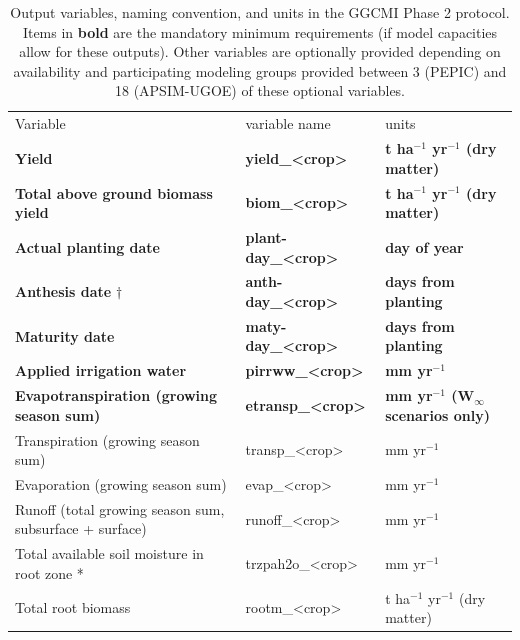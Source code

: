 \documentclass[gmd, manuscript]{copernicus} %
\begin{document}
\begin{table}[]
  \caption{Output variables, naming convention, and units in the GGCMI Phase 2 protocol. Items in \textbf{bold} are the mandatory minimum requirements (if model capacities allow for these outputs). Other variables are optionally provided depending on availability and participating modeling groups provided between 3 (PEPIC) and 18 (APSIM-UGOE) of these optional variables.}
  \label{table:outputs}
  \begin{tabular}{lll}
    \tophline \vspace{1mm}
    Variable                                & variable name             & units \\
    \middlehline \vspace{1mm}
    \textbf{Yield}                                   & \textbf{yield\_<crop>}     & \textbf{t ha$^{-1}$ yr$^{-1}$ (dry matter)}\\
    \textbf{Total above ground biomass yield}        & \textbf{biom\_<crop>}      & \textbf{t ha$^{-1}$ yr$^{-1}$ (dry matter)}\\
    \textbf{Actual planting date}                    & \textbf{plant-day\_<crop>} & \textbf{day of year}\\
    \textbf{Anthesis date} $\dagger$                 & \textbf{anth-day\_<crop>}  & \textbf{days from planting} \\
    \textbf{Maturity date}                           & \textbf{maty-day\_<crop>}  & \textbf{days from planting}\\
    \textbf{Applied irrigation water}                & \textbf{pirrww\_<crop>}    & \textbf{mm yr$^{-1}$} \\
    \textbf{Evapotranspiration (growing season sum)} & \textbf{etransp\_<crop>}   & \textbf{mm yr$^{-1}$ (W$_{\infty}$ scenarios only)}\\ \middlehline
    Transpiration (growing season sum)                       & transp\_<crop>    & mm yr$^{-1}$ \\
    Evaporation (growing season sum)                         & evap\_<crop>      & mm yr$^{-1}$ \\
    Runoff (total growing season sum, subsurface + surface)  & runoff\_<crop>    & mm yr$^{-1}$                    \\
    Total available soil moisture in root zone *             & trzpah2o\_<crop>  & mm yr$^{-1}$                    \\
    Total root biomass                                       & rootm\_<crop>     & t ha$^{-1}$ yr$^{-1}$ (dry matter)  \\

\end{tabular}
\end{table}
\end{document}
